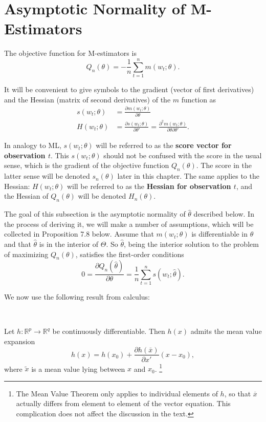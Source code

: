 \section{Asymptotic Normality of M-Estimators}

The objective function for M-estimators is 
\begin{equation}
    Q_n(\theta) = -\frac{1}{n} \sum_{t=1}^n m(w_t; \theta).
\end{equation}

It will be convenient to give symbols to the gradient (vector of first derivatives) and the Hessian (matrix of second derivatives) of the $m$ function as
\begin{align}
    s(w_t; \theta) &= \frac{\partial m(w_t; \theta)}{\partial \theta} \\
    H(w_t; \theta) &= \frac{\partial s(w_t; \theta)}{\partial \theta'} = \frac{\partial^2 m(w_t; \theta)}{\partial \theta \partial \theta'}.
\end{align}

In analogy to ML, $s(w_t; \theta)$ will be referred to as the \textbf{score vector for observation $t$}. 
This $s(w_t; \theta)$ should not be confused with the score in the usual sense, 
which is the gradient of the objective function $Q_n(\theta)$. 
The score in the latter sense will be denoted $s_n(\theta)$ later in this chapter. 
The same applies to the Hessian: $H(w_t; \theta)$ will be referred to as the \textbf{Hessian for observation $t$}, 
and the Hessian of $Q_n(\theta)$ will be denoted $H_n(\theta)$.

The goal of this subsection is the asymptotic normality of $\hat{\theta}$ described below. 
In the process of deriving it, we will make a number of assumptions, which will be collected in Proposition 7.8 below. Assume that $m(w_t; \theta)$ is differentiable in $\theta$ and that $\hat{\theta}$ is in the interior of $\Theta$. So $\hat{\theta}$, being the interior solution to the problem of maximizing $Q_n(\theta)$, satisfies the first-order conditions
\begin{equation}\label{eq: 9.4}
    0 = \frac{\partial Q_n(\hat{\theta})}{\partial \theta} = \frac{1}{n} \sum_{t=1}^n s(w_t; \hat{\theta}).
\end{equation}

We now use the following result from calculus:

\begin{theorem}
    \

    Let $h : \mathbb{R}^p \rightarrow \mathbb{R}^q$ be continuously differentiable. Then $h(x)$ admits the mean value expansion
    \begin{equation}
        h(x) = h(x_0) + \frac{\partial h(\bar{x})}{\partial x'} (x - x_0),
    \end{equation}
    where $\tilde{x}$ is a mean value lying between $x$ and $x_0$.
    \footnote{The Mean Value Theorem only applies to individual elements of $h$, so that $\overline{x}$ actually differs from element to
    element of the vector equation. This complication does not affect the discussion in the text.}
\end{theorem}

